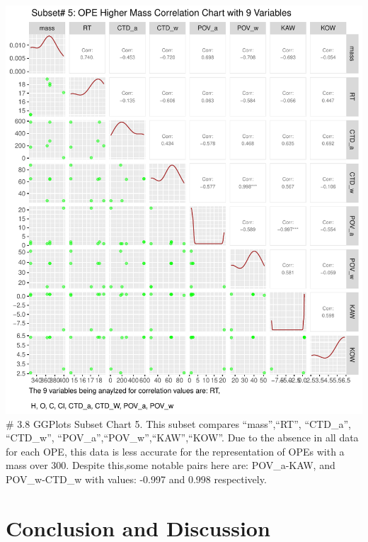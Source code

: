 \documentclass[journal=jacsat,manuscript=article]{achemso}
\begin{document}
\includegraphics{Rahmi_Chowdhury_500621744_Final_project_files/figure-latex/unnamed-chunk-9-1.pdf}
\# 3.8 GGPlots Subset Chart 5. This subset compares ``mass'',``RT'',
``CTD\_a'', ``CTD\_w'', ``POV\_a'',``POV\_w'',``KAW'',``KOW''. Due to
the absence in all data for each OPE, this data is less accurate for the
representation of OPEs with a mass over 300. Despite this,some notable
pairs here are: POV\_a-KAW, and POV\_w-CTD\_w with values: -0.997 and
0.998 respectively.

\hypertarget{conclusion-and-discussion}{%
\section{Conclusion and Discussion}\label{conclusion-and-discussion}}
\end{document}
